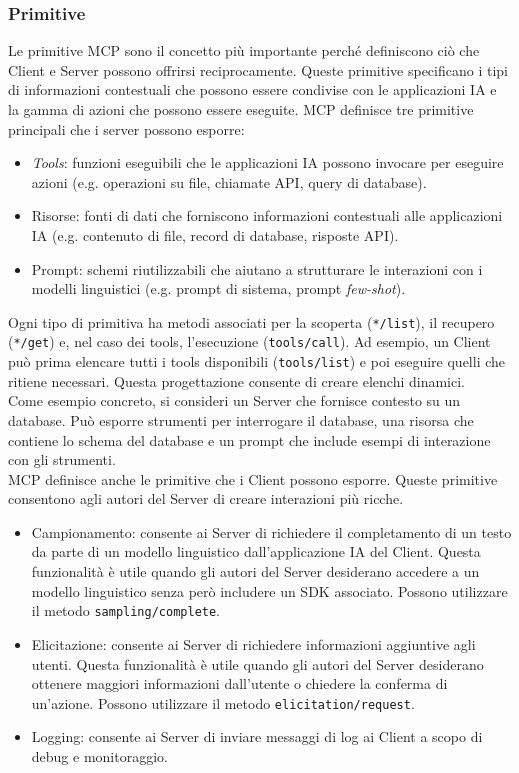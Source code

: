 \subsubsection{Primitive}
Le primitive MCP sono il concetto più importante perché definiscono ciò che Client e Server possono offrirsi reciprocamente. 
Queste primitive specificano i tipi di informazioni contestuali che possono essere condivise con le applicazioni IA e la gamma di azioni che 
possono essere eseguite. MCP definisce tre primitive principali che i server possono esporre:
\begin{itemize}
\item \textit{Tools}: funzioni eseguibili che le applicazioni IA possono invocare per eseguire azioni (e.g. operazioni su file, chiamate API, query di database).
\item Risorse: fonti di dati che forniscono informazioni contestuali alle applicazioni IA (e.g. contenuto di file, record di database, risposte API).
\item Prompt: schemi riutilizzabili che aiutano a strutturare le interazioni con i modelli linguistici (e.g. prompt di sistema, prompt \textit{few-shot}).
\end{itemize}
Ogni tipo di primitiva ha metodi associati per la scoperta (\texttt{*/list}), il recupero (\texttt{*/get}) e, nel caso dei tools, l'esecuzione (\texttt{tools/call}). 
Ad esempio, un Client può prima elencare tutti i tools disponibili (\texttt{tools/list}) e poi eseguire quelli che ritiene necessari. Questa progettazione consente di creare elenchi dinamici. \\
Come esempio concreto, si consideri un Server che fornisce contesto su un database. Può esporre strumenti per interrogare il database, una risorsa che contiene lo schema 
del database e un prompt che include esempi di interazione con gli strumenti. \\
MCP definisce anche le primitive che i Client possono esporre. Queste primitive consentono agli autori del Server di creare interazioni più ricche.
\begin{itemize}
\item Campionamento: consente ai Server di richiedere il completamento di un testo da parte di un modello linguistico dall'applicazione IA del Client. Questa funzionalità è utile quando gli autori del Server desiderano
accedere a un modello linguistico senza però includere un SDK associato. Possono utilizzare il metodo \texttt{sampling/complete}.
\item Elicitazione: consente ai Server di richiedere informazioni aggiuntive agli utenti. Questa funzionalità è utile quando gli autori del Server desiderano ottenere maggiori informazioni dall'utente o chiedere la conferma 
di un'azione. Possono utilizzare il metodo \texttt{elicitation/request}.
\item Logging: consente ai Server di inviare messaggi di log ai Client a scopo di debug e monitoraggio.
\cite{modelcontextprotocol2024arch}
\end{itemize}

